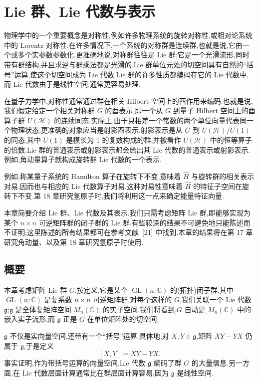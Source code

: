 \chapter{Lie 群、Lie 代数与表示}
\label{chap:lie-groups}

物理学中的一个重要概念是对称性,例如许多物理系统的旋转对称性,或相对论系统中的 Lorentz 对称性.在许多情况下,一个系统的对称群是连续群,也就是说,它由一个或多个实参数参数化.更准确地说,对称群往往是 Lie 群:它是一个光滑流形,同时带有群结构,并且求逆与群乘法都是光滑的.Lie 群单位元处的切空间具有自然的“括号”运算,使这个切空间成为 Lie 代数.Lie 群的许多性质都编码在它的 Lie 代数中,而 Lie 代数由于是线性空间,通常更容易处理.

在量子力学中,对称性通常通过群在相关 Hilbert 空间上的酉作用来编码.也就是说,我们假定给定一个相关对称群 $G$ 的酉表示,即一个从 $G$ 到量子 Hilbert 空间上的酉算子群 $U(\mathcal H)$ 的连续同态.实际上,由于只相差一个常数的两个单位向量代表同一个物理状态,更准确的对象应当是射影酉表示.射影表示是从 $G$ 到 $U(\mathcal H)/U(1)$ 的同态,其中 $U(1)$ 是模长为 $1$ 的复数构成的群,并被看作 $U(\mathcal H)$ 中的恒等算子的倍数.Lie 群的普通表示或射影表示都会给出其 Lie 代数的普通表示或射影表示.例如,角动量算子就构成旋转群 Lie 代数的一个表示.

例如,称某量子系统的 Hamilton 算子在旋转下不变,意味着 $\widehat H$ 与旋转群的相关表示对易,因而也与相应的 Lie 代数算子对易.这种对易性意味着 $\widehat H$ 的特征子空间在旋转下不变.第 18 章研究氢原子时,我们将利用这一点来确定能量特征向量.

本章简要介绍 Lie 群、Lie 代数及其表示.我们只需考虑矩阵 Lie 群,即能够实现为某个 $n\times n$ 可逆矩阵群的闭子群的 Lie 群.有些较深的结果不可避免地只能陈述而不证明;这里陈述的所有结果都可在参考文献~[21] 中找到.本章的结果将在第 17 章研究角动量、以及第 18 章研究氢原子时使用.

\section{概要}
\label{sec:lie-summary}

本章考虑矩阵 Lie 群 $G$.按定义,它是某个 $\operatorname{GL}(n;\mathbb C)$ 的(拓扑)闭子群,其中 $\operatorname{GL}(n;\mathbb C)$ 是复系数 $n\times n$ 可逆矩阵群.对每个这样的 $G$,我们关联一个 Lie 代数 $\mathfrak g$;$\mathfrak g$ 是全体复矩阵空间 $M_n(\mathbb C)$ 的实子空间.我们将看到,$G$ 自动是 $M_n(\mathbb C)$ 中的嵌入实子流形,而 $\mathfrak g$ 正是 $G$ 在单位矩阵处的切空间.

$\mathfrak g$ 不仅是实向量空间,还带有一个“括号”运算.具体地,对 $X,Y\in\mathfrak g$,矩阵 $XY-YX$ 仍属于 $\mathfrak g$,于是定义
\[
[X,Y]=XY-YX.
\label{eq:lie-commutator}
\]
事实证明,作为带括号运算的向量空间,Lie 代数 $\mathfrak g$ 编码了群 $G$ 的大量信息.另一方面,在 Lie 代数层面计算通常比在群层面计算容易,因为 $\mathfrak g$ 是线性空间.

